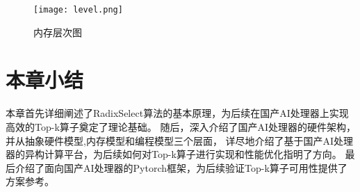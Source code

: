 \begin{figure}[ht]
    \centering
    \texttt{[image: level.png]}
    \caption{内存层次图}
    \label{fig:level}
    \note{}
  \end{figure}



\section{本章小结}
本章首先详细阐述了RadixSelect算法的基本原理，为后续在国产AI处理器上实现高效的Top-k算子奠定了理论基础。
随后，深入介绍了国产AI处理器的硬件架构，并从抽象硬件模型,内存模型和编程模型三个层面，
详尽地介绍了基于国产AI处理器的异构计算平台，为后续如何对Top-k算子进行实现和性能优化指明了方向。
最后介绍了面向国产AI处理器的Pytorch框架，为后续验证Top-k算子可用性提供了方案参考。